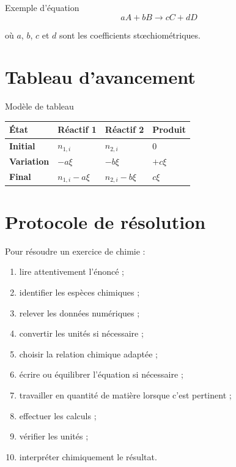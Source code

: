 \documentclass[11pt,a4paper]{article}
\begin{document}
\begin{cadregris}{Exemple d’équation}
\[
aA + bB \longrightarrow cC + dD
\]

où $a$, $b$, $c$ et $d$ sont les coefficients stœchiométriques.
\end{cadregris}

\section{Tableau d’avancement}

\begin{cadregris}{Modèle de tableau}
\renewcommand{\arraystretch}{1.35}
\begin{tabularx}{\textwidth}{>{\bfseries}p{3cm}X X X}
\toprule
État & Réactif 1 & Réactif 2 & Produit \\
\midrule
Initial & $n_{1,i}$ & $n_{2,i}$ & $0$ \\
Variation & $-a\xi$ & $-b\xi$ & $+c\xi$ \\
Final & $n_{1,i}-a\xi$ & $n_{2,i}-b\xi$ & $c\xi$ \\
\bottomrule
\end{tabularx}
\end{cadregris}

\section{Protocole de résolution}

\begin{cadremethode}
Pour résoudre un exercice de chimie :

\begin{enumerate}
    \item lire attentivement l’énoncé ;
    \item identifier les espèces chimiques ;
    \item relever les données numériques ;
    \item convertir les unités si nécessaire ;
    \item choisir la relation chimique adaptée ;
    \item écrire ou équilibrer l’équation si nécessaire ;
    \item travailler en quantité de matière lorsque c’est pertinent ;
    \item effectuer les calculs ;
    \item vérifier les unités ;
    \item interpréter chimiquement le résultat.
\end{enumerate}
\end{cadremethode}
\end{document}

